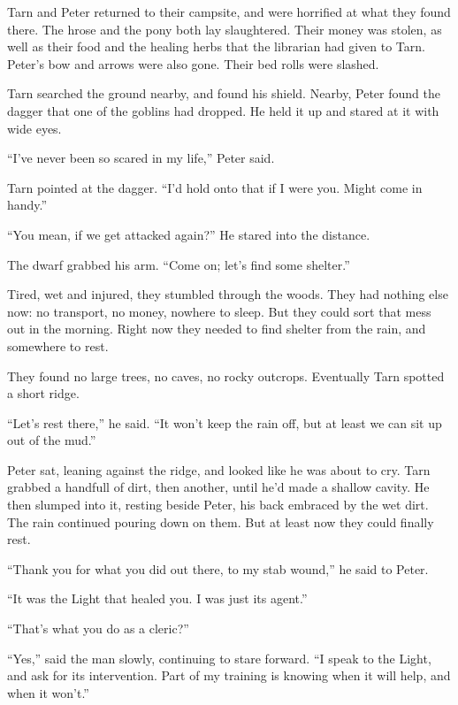 
Tarn and Peter returned to their campsite, and were horrified at what they found there.  The hrose and the pony both lay slaughtered.  Their money was stolen, as well as their food and the healing herbs that the librarian had given to Tarn.  Peter's bow and arrows were also gone.  Their bed rolls were slashed.

Tarn searched the ground nearby, and found his shield.  Nearby, Peter found the dagger that one of the goblins had dropped.  He held it up and stared at it with wide eyes.

``I've never been so scared in my life,'' Peter said.

Tarn pointed at the dagger.  ``I'd hold onto that if I were you.  Might come in handy.''

``You mean, if we get attacked again?''  He stared into the distance.

The dwarf grabbed his arm.  ``Come on; let's find some shelter.''

Tired, wet and injured, they stumbled through the woods.  They had nothing else now: no transport, no money, nowhere to sleep.  But they could sort that mess out in the morning.  Right now they needed to find shelter from the rain, and somewhere to rest.

They found no large trees, no caves, no rocky outcrops.  Eventually Tarn spotted a short ridge.

``Let's rest there,'' he said.  ``It won't keep the rain off, but at least we can sit up out of the mud.''

Peter sat, leaning against the ridge, and looked like he was about to cry.  Tarn grabbed a handfull of dirt, then another, until he'd made a shallow cavity.  He then slumped into it, resting beside Peter, his back embraced by the wet dirt.  The rain continued pouring down on them.  But at least now they could finally rest.

``Thank you for what you did out there, to my stab wound,'' he said to Peter.

``It was the Light that healed you.  I was just its agent.''

``That's what you do as a cleric?''

``Yes,'' said the man slowly, continuing to stare forward.  ``I speak to the Light, and ask for its intervention.  Part of my training is knowing when it will help, and when it won't.''

